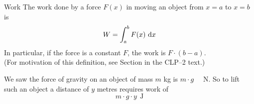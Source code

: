 \begin{frame}[t]
\begin{block}{Work}
The work done by a force $F(x)$ in moving an object from $x=a$ to $x=b$ is
\begin{align*}
W=\int_a^b F(x)\ \text{d}{x}
\end{align*}
In particular, if the force is a constant $F$,
the work is $F\cdot(b-a)$.\\[1em]
(For motivation of this definition, see Section  in the CLP--2 text.)
\end{block}\pause
We saw the force of gravity on an object of mass $m$ kg is $m\cdot g$~~ N. So to lift such an object a distance of $y$ metres requires work of
\[m\cdot g\cdot y~~\text{J}\]
\end{frame}


